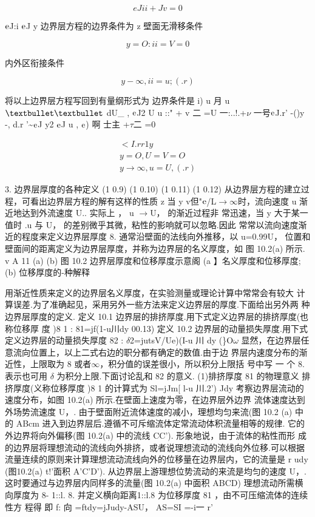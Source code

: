 \[eJ ii + Jv = 0\]

${\rm e}$J:i ${\rm e}$J y 边界层方程的边界条件为 z 壁面无滑移条件

\[y = O:ii = V = 0\]

内外区衔接条件

\[y- \infty  ,  ii = u; (.r)\]

将以上边界层方程写回到有量纲形式为 边界条件是 i) u 月 u ${\rm ••}$ dU\_ , ${\rm e}$J2 U u ::" + v 二 =U 一:..!.+$\nu$ 一号${\rm e}$J.r' -()y -, d.r '\textasciitilde{}${\rm e}$J y2 ${\rm e}$J u , ${\rm e}$) 啊 士主 +$\tau$二 =0

\begin{gather*}
<I.r r1 y\\
y=O , U=V=O\\
y \rightarrow \infty  ,  u = U,(.r)
\end{gather*}

3. 边界层厚度的各种定义 (1 0.9) (1 0.10) (1 0.11) (1 0.12) 从边界层方程的建立过程，可看出边界层方程的解有这样的性质 z 当 y v但"${\rm e}$/L$\rightarrow$$\infty$时，流向速度 u 渐近地达到外流速度 U.. 实际上 ， u $\rightarrow$U， 的渐近过程非 常迅速，当 y 大于某一值时 .u 与 U， 的差别微乎其微，粘性的影响就可以忽略.因此 常常以流向速度渐近的程度来定义边界层厚度 8. 通常沿壁面的法线向外推移，以 u=0.99U， 位置和壁面间的距离定义为边界层厚度，并称为边界层的名义厚度，如 图 10.2(a) 所示. v A 11 (a) (b) 图 10.2 边界层厚度和位移厚度示意阁 (a 】名义厚度和位移厚度; (b) 位移厚度的-种解释

用渐近性质来定义的边界层名义厚度，在实验测量或理论计算中常常会有较大 计算误差.为了准确起见，采用另外一些方法来定义边界层的厚度.下面给出另外两 种边界层厚度的定义. 定义 10.1 边界层的排挤厚度.用下式定义边界层的排挤厚度(也称位移厚 度 )8 1 : 81=jf(1-u川dy 00.13) 定义 10.2 边界层的动量损失厚度.用下式定义边界层的动量损失厚度 82 : $\delta$2=jutsV/Ue)(I-u 川 dy (\}O$\omega$ 显然，在边界层任意流向位置上，以上二式右边的职分都有确定的数值.由于边 界层内速度分布的渐近性，上限取为 8 或者$\infty$，积分值的误差很小，所以积分上限括 号中写 一 个 8. 表示也可用 $\delta$ 为积分上限.下面讨论乱和 82 的意义. (1)排挤厚度 81 的物理意义 排挤厚度(义称位移厚度 )8 1 的计算式为 Sl=jJm[ l-u 川.2') Jdy 考察边界层流动的速度分布，如图 10.2(a) 所示.在壁面上速度为零，在边界层外边界 流体速度达到外场势流速度 U，. 由于壁面附近流体速度的减小，理想均匀来流(图 10.2 (a) 中的 ABcm 进入到边界层后.遵循不可斥缩流体定常流动体积流量相等的规律. 它的外边界将向外偏移(图 10.2(a) 中的流线 CC'). 形象地说，由于流体的粘性而形 成的边界层将理想流动的流线向外排挤，或者说理想流动的流线向外位移.可以根据 流量连续的原则来计算理想流动流线向外的位移量在边界层内，它的流量是 r udy (图10.2(a) t!'面积 A'C'D'). 从边界层上游理想位势流动的来流是均匀的速度 U，. 这时要通过与边界层内同样多的流量(图 10.2(a) 中面积 ABCD) 理想流动所需横 向厚度为 8- 1::l. 8. 并定义横向距离1::l.8 为位移厚度 81 ，由不可压缩流体的连续性方 程得 即 f: 向 =ftdy=jJudy-ASU， AS=SI =-i一 r'


